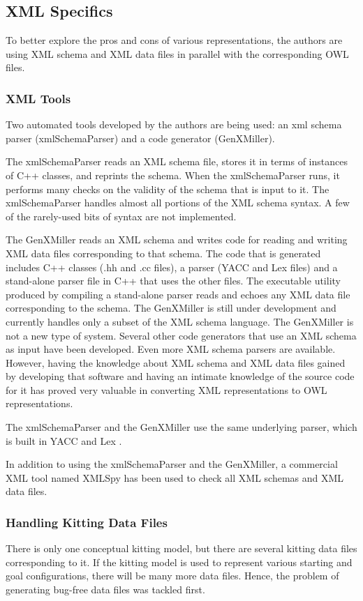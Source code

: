 \subsection{XML Specifics}
To better explore the pros and cons of various representations,
the authors are using XML schema and XML data files in parallel with the
corresponding OWL files.\\

\subsubsection{XML Tools}
Two automated tools developed by the authors are being used: an xml schema
parser (xmlSchemaParser) and a code generator (GenXMiller).  

The xmlSchemaParser reads an XML schema file, stores it in terms of
instances of C++ classes, and reprints the schema. When the xmlSchemaParser
runs, it performs many checks on the validity of the schema that is input
to it. The xmlSchemaParser handles almost all portions of the XML schema
syntax. A few of the rarely-used bits of syntax are not implemented.

The GenXMiller reads an XML schema and writes code for reading and writing
XML data files corresponding to that schema. The code that is generated
includes C++ classes (.hh and .cc files), a parser (YACC and Lex files) and
a stand-alone parser file in C++ that uses the other files.  The executable
utility produced by compiling a stand-alone parser reads and echoes any XML
data file corresponding to the schema. The GenXMiller is still under
development and currently handles only a subset of the XML schema language. 
The GenXMiller is not a
new type of system. Several other code generators that use an XML schema
as input have been developed. Even more XML schema parsers are
available. However, having the knowledge about XML schema and XML data
files gained by developing that software and having an intimate knowledge
of the source code for it has proved very valuable in converting XML representations
to OWL representations.

The xmlSchemaParser and the GenXMiller use the same underlying parser,
which is built in YACC and Lex \cite{LexAndYACC}.

In addition to using the xmlSchemaParser and the GenXMiller, a commercial
XML tool named XMLSpy \cite{XMLSpyManual} has been used to check all XML
schemas and XML data files.\\

\subsubsection{Handling Kitting Data Files}
There is only one conceptual kitting model, but there are several kitting
data files corresponding to it. If the kitting model is used to represent
various starting and goal configurations, there
will be many more data files. Hence, the problem of generating bug-free
data files was tackled first.

